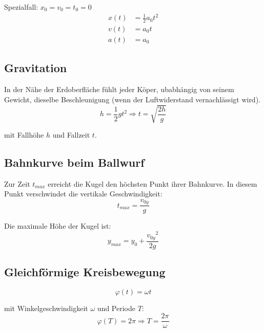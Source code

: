 \documentclass[11pt]{article}
\begin{document}
Spezialfall: $x_0 = v_0 = t_0 = 0$ \newline
\begin{equation*}
\begin{split}
	x(t)& = \frac{1}{2}a_0t^2 \\
	v(t)& = a_0t \\
	a(t)& = a_0
\end{split}
\end{equation*}

\subsection{Gravitation}
In der N{\"a}he der Erdoberfl{\"a}che f{\"u}hlt jeder K{\"o}per, ubabh{\"a}ngig von seinem Gewicht, dieselbe Beschleunigung (wenn der Luftwiderstand vernachl{\"a}ssigt wird).
\begin{equation*}
	h = \frac{1}{2}gt^2 \Rightarrow t = \sqrt{\frac{2h}{g}}
\end{equation*}

mit Fallh{\"o}he $h$ und Fallzeit $t$.

\subsection{Bahnkurve beim Ballwurf}

Zur Zeit $t_{max}$ erreicht die Kugel den h{\"o}chsten Punkt ihrer Bahnkurve. In diesem Punkt verschwindet die vertikale Geschwindigkeit:
\begin{equation*}
	t_{max} = \frac{v_{0y}}{g}
\end{equation*}

Die maximale H{\"o}he der Kugel ist:
\begin{equation*}
	y_{max} = y_0 + \frac{{v_{0y}}^2}{2g}
\end{equation*}

\subsection{Gleichf{\"o}rmige Kreisbewegung}

\begin{equation*}
	\varphi(t) = \omega t
\end{equation*}

mit Winkelgeschwindigkeit $\omega$ und Periode $T$:
\begin{equation*}
	\varphi(T) = 2 \pi \Rightarrow T = \frac{2 \pi}{\omega}
\end{equation*}
\end{document}
